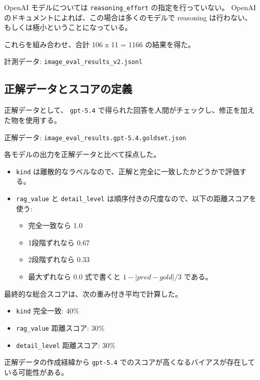 \documentclass[
]{article}
\providecommand{\tightlist}{%
  \setlength{\itemsep}{0pt}\setlength{\parskip}{0pt}}
\begin{document}
OpenAI モデルについては \texttt{reasoning\_effort}
の指定を行っていない。 OpenAI
のドキュメントによれば、この場合は多くのモデルで reasoning は行わない、
もしくは極小ということになっている。

これらを組み合わせ、合計 106 x 11 = 1166 の結果を得た。

計測データ: \texttt{image\_eval\_results\_v2.jsonl}

\subsection{正解データとスコアの定義}\label{ux6b63ux89e3ux30c7ux30fcux30bfux3068ux30b9ux30b3ux30a2ux306eux5b9aux7fa9}

正解データとして、 \texttt{gpt-5.4}
で得られた回答を人間がチェックし、修正を加えた物を使用する。

正解データ: \texttt{image\_eval\_results.gpt-5.4.goldset.json}

各モデルの出力を正解データと比べて採点した。

\begin{itemize}
\tightlist
\item
  \texttt{kind}
  は離散的なラベルなので、正解と完全に一致したかどうかで評価する。
\item
  \texttt{rag\_value} と \texttt{detail\_level}
  は順序付きの尺度なので、以下の距離スコアを使う:

  \begin{itemize}
  \tightlist
  \item
    完全一致なら 1.0
  \item
    1段階ずれなら 0.67
  \item
    2段階ずれなら 0.33
  \item
    最大ずれなら 0.0 式で書くと
    \(1 - |\mathit{pred} - \mathit{gold}| / 3\) である。
  \end{itemize}
\end{itemize}

最終的な総合スコアは、次の重み付き平均で計算した。

\begin{itemize}
\tightlist
\item
  \texttt{kind} 完全一致: 40\%
\item
  \texttt{rag\_value} 距離スコア: 30\%
\item
  \texttt{detail\_level} 距離スコア: 30\%
\end{itemize}

正解データの作成経緯から \texttt{gpt-5.4}
でのスコアが高くなるバイアスが存在している可能性がある。
\end{document}
